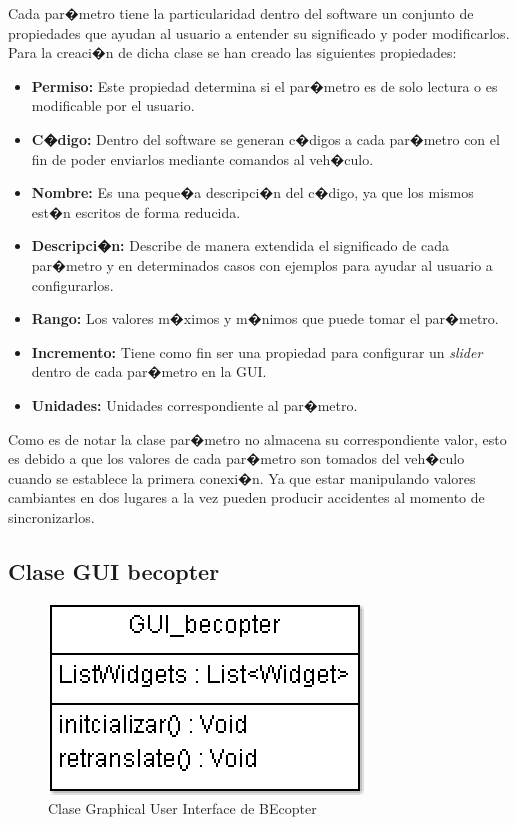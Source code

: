 Cada par�metro tiene la particularidad dentro del software un conjunto de propiedades que ayudan al usuario a entender su significado y poder modificarlos. Para la creaci�n de dicha clase se han creado las siguientes propiedades:

\begin{itemize}
	\item \textbf{Permiso:     } Este propiedad determina si el par�metro es de solo lectura o es modificable por el usuario. 
	\item \textbf{C�digo:      } Dentro del software se generan c�digos a cada par�metro con el fin de poder enviarlos mediante comandos al veh�culo.
	\item \textbf{Nombre:      } Es una peque�a descripci�n del c�digo, ya que los mismos est�n escritos de forma reducida.
	\item \textbf{Descripci�n: } Describe de manera extendida el significado de cada par�metro y en determinados casos con ejemplos para ayudar al usuario a configurarlos.
	\item \textbf{Rango:       } Los valores m�ximos y m�nimos que puede tomar el par�metro.
	\item \textbf{Incremento:  } Tiene como fin ser una propiedad para configurar un \textit{slider} dentro de cada par�metro en la GUI.
	\item \textbf{Unidades:    } Unidades correspondiente al par�metro.
\end{itemize}
Como es de notar la clase par�metro no almacena su correspondiente valor, esto es debido a que los valores de cada par�metro son tomados del veh�culo cuando se establece la primera conexi�n. Ya que estar manipulando valores cambiantes en dos lugares a la vez pueden producir accidentes al momento de sincronizarlos.

\newpage
\subsection{Clase GUI becopter}

\begin{figure}[h!]
	\centering
	\includegraphics[width=0.2\linewidth, height=0.15\textheight]{Imagenes/classGUI_becopter}
	\caption{Clase Graphical User Interface de BEcopter}
	\label{fig:classguibecopter}
\end{figure}

